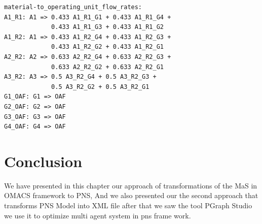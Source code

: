 \begin{lstlisting}[caption=Part from Graph.in]
material-to_operating_unit_flow_rates:
A1_R1: A1 => 0.433 A1_R1_G1 + 0.433 A1_R1_G4 +
			 0.433 A1_R1_G3 + 0.433 A1_R1_G2
A1_R2: A1 => 0.433 A1_R2_G4 + 0.433 A1_R2_G3 + 
			 0.433 A1_R2_G2 + 0.433 A1_R2_G1
A2_R2: A2 => 0.633 A2_R2_G4 + 0.633 A2_R2_G3 + 
			 0.633 A2_R2_G2 + 0.633 A2_R2_G1
A3_R2: A3 => 0.5 A3_R2_G4 + 0.5 A3_R2_G3 + 
			 0.5 A3_R2_G2 + 0.5 A3_R2_G1
G1_OAF: G1 => OAF
G2_OAF: G2 => OAF
G3_OAF: G3 => OAF
G4_OAF: G4 => OAF

\end{lstlisting}


\section{Conclusion}
We have presented in this chapter our approach of transformations of the MaS in OMACS 
framework to PNS, And we also presented our the second approach that transforms PNS Model into XML file after that we saw the tool PGraph Studio we use it to optimize multi agent system in pns frame work.